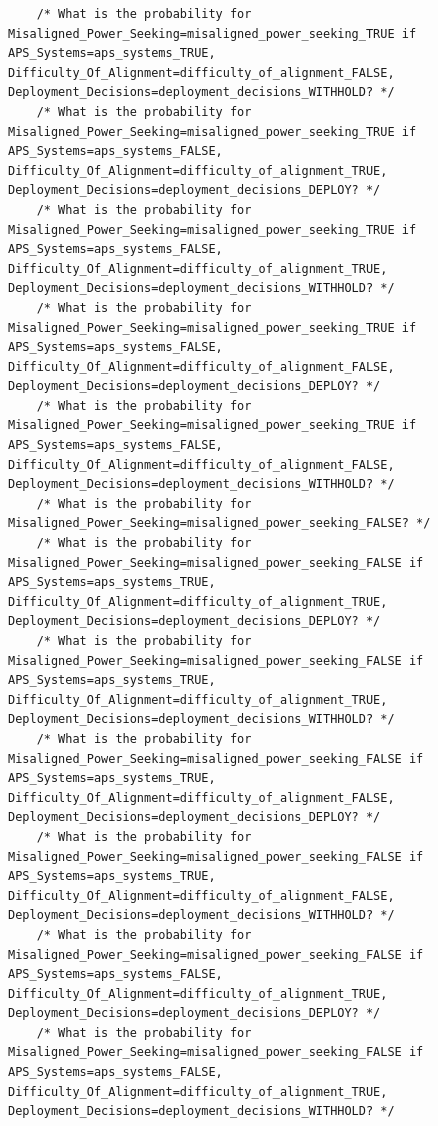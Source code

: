 \documentclass[
  11pt,
  letterpaper,
]{book}
\begin{document}
\begin{landscape}
\begin{verbatim}
    /* What is the probability for Misaligned_Power_Seeking=misaligned_power_seeking_TRUE if APS_Systems=aps_systems_TRUE, Difficulty_Of_Alignment=difficulty_of_alignment_FALSE, Deployment_Decisions=deployment_decisions_WITHHOLD? */
    /* What is the probability for Misaligned_Power_Seeking=misaligned_power_seeking_TRUE if APS_Systems=aps_systems_FALSE, Difficulty_Of_Alignment=difficulty_of_alignment_TRUE, Deployment_Decisions=deployment_decisions_DEPLOY? */
    /* What is the probability for Misaligned_Power_Seeking=misaligned_power_seeking_TRUE if APS_Systems=aps_systems_FALSE, Difficulty_Of_Alignment=difficulty_of_alignment_TRUE, Deployment_Decisions=deployment_decisions_WITHHOLD? */
    /* What is the probability for Misaligned_Power_Seeking=misaligned_power_seeking_TRUE if APS_Systems=aps_systems_FALSE, Difficulty_Of_Alignment=difficulty_of_alignment_FALSE, Deployment_Decisions=deployment_decisions_DEPLOY? */
    /* What is the probability for Misaligned_Power_Seeking=misaligned_power_seeking_TRUE if APS_Systems=aps_systems_FALSE, Difficulty_Of_Alignment=difficulty_of_alignment_FALSE, Deployment_Decisions=deployment_decisions_WITHHOLD? */
    /* What is the probability for Misaligned_Power_Seeking=misaligned_power_seeking_FALSE? */
    /* What is the probability for Misaligned_Power_Seeking=misaligned_power_seeking_FALSE if APS_Systems=aps_systems_TRUE, Difficulty_Of_Alignment=difficulty_of_alignment_TRUE, Deployment_Decisions=deployment_decisions_DEPLOY? */
    /* What is the probability for Misaligned_Power_Seeking=misaligned_power_seeking_FALSE if APS_Systems=aps_systems_TRUE, Difficulty_Of_Alignment=difficulty_of_alignment_TRUE, Deployment_Decisions=deployment_decisions_WITHHOLD? */
    /* What is the probability for Misaligned_Power_Seeking=misaligned_power_seeking_FALSE if APS_Systems=aps_systems_TRUE, Difficulty_Of_Alignment=difficulty_of_alignment_FALSE, Deployment_Decisions=deployment_decisions_DEPLOY? */
    /* What is the probability for Misaligned_Power_Seeking=misaligned_power_seeking_FALSE if APS_Systems=aps_systems_TRUE, Difficulty_Of_Alignment=difficulty_of_alignment_FALSE, Deployment_Decisions=deployment_decisions_WITHHOLD? */
    /* What is the probability for Misaligned_Power_Seeking=misaligned_power_seeking_FALSE if APS_Systems=aps_systems_FALSE, Difficulty_Of_Alignment=difficulty_of_alignment_TRUE, Deployment_Decisions=deployment_decisions_DEPLOY? */
    /* What is the probability for Misaligned_Power_Seeking=misaligned_power_seeking_FALSE if APS_Systems=aps_systems_FALSE, Difficulty_Of_Alignment=difficulty_of_alignment_TRUE, Deployment_Decisions=deployment_decisions_WITHHOLD? */

\end{verbatim}
\end{landscape}
\end{document}
